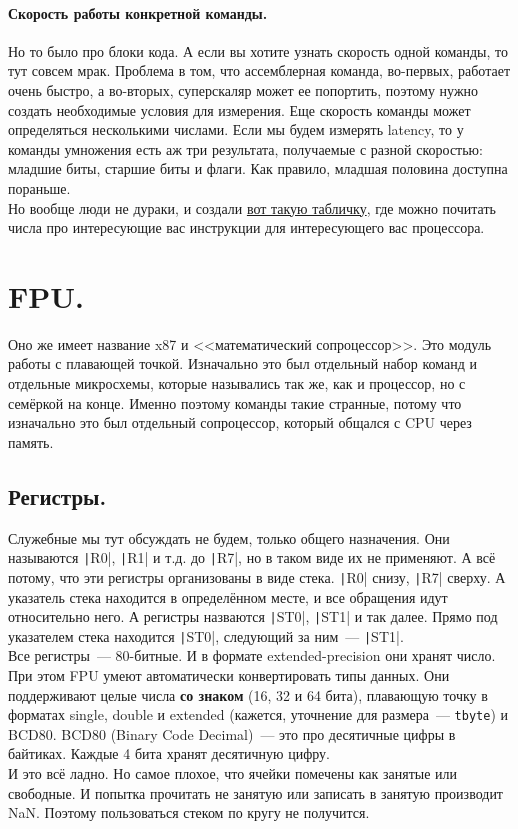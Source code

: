 \documentclass{article}
\begin{document}
    \paragraph{Скорость работы конкретной команды.}
    Но то было про блоки кода. А если вы хотите узнать скорость одной команды, то тут совсем мрак. Проблема в том, что ассемблерная команда, во-первых, работает очень быстро, а во-вторых, суперскаляр может ее попортить, поэтому нужно создать необходимые условия для измерения. Еще скорость команды может определяться несколькими числами. Если мы будем измерять latency, то у команды умножения есть аж три результата, получаемые с разной скоростью: младшие биты, старшие биты и флаги. Как правило, младшая половина доступна пораньше.\\
    Но вообще люди не дураки, и создали \href{https://uops.info/table.html}{вот такую табличку}, где можно почитать числа про интересующие вас инструкции для интересующего вас процессора.
    \section{FPU.}
    Оно же имеет название x87 и <<математический сопроцессор>>. Это модуль работы с плавающей точкой. Изначально это был отдельный набор команд и отдельные микросхемы, которые назывались так же, как и процессор, но с семёркой на конце. Именно поэтому команды такие странные, потому что изначально это был отдельный сопроцессор, который общался с CPU через память.
    \subsection{Регистры.}
    Служебные мы тут обсуждать не будем, только общего назначения. Они называются \texttt|R0|, \texttt|R1| и т.д. до \texttt|R7|, но в таком виде их не применяют. А всё потому, что эти регистры организованы в виде стека. \texttt|R0| снизу, \texttt|R7| сверху. А указатель стека находится в определённом месте, и все обращения идут относительно него. А регистры назваются \texttt|ST0|, \texttt|ST1| и так далее. Прямо под указателем стека находится \texttt|ST0|, следующий за ним~--- \texttt|ST1|.\\
    Все регистры~--- 80-битные. И в формате extended-precision они хранят число. При этом FPU умеют автоматически конвертировать типы данных. Они поддерживают целые числа \textbf{со знаком} (16, 32 и 64 бита), плавающую точку в форматах single, double и extended (кажется, уточнение для размера~--- \Verb|tbyte|) и BCD80. BCD80 (Binary Code Decimal)~--- это про десятичные цифры в байтиках. Каждые 4 бита хранят десятичную цифру.\\
    И это всё ладно. Но самое плохое, что ячейки помечены как занятые или свободные. И попытка прочитать не занятую или записать в занятую производит NaN. Поэтому пользоваться стеком по кругу не получится.\\
\end{document}
